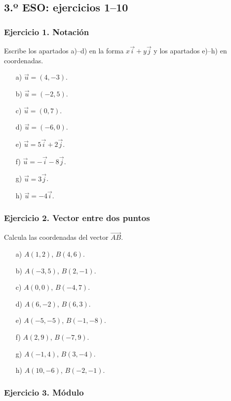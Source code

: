 \subsection{3.º ESO: ejercicios 1--10}

\subsubsection*{Ejercicio 1. Notación}

Escribe los apartados a)--d) en la forma $x\vec{i}+y\vec{j}$ y los apartados e)--h) en coordenadas.

\begin{enumerate}
    \item[a)] $\vec{u}=(4,-3)$.
    \item[b)] $\vec{u}=(-2,5)$.
    \item[c)] $\vec{u}=(0,7)$.
    \item[d)] $\vec{u}=(-6,0)$.
    \item[e)] $\vec{u}=5\vec{i}+2\vec{j}$.
    \item[f)] $\vec{u}=-\vec{i}-8\vec{j}$.
    \item[g)] $\vec{u}=3\vec{j}$.
    \item[h)] $\vec{u}=-4\vec{i}$.
\end{enumerate}

\subsubsection*{Ejercicio 2. Vector entre dos puntos}

Calcula las coordenadas del vector $\overrightarrow{AB}$.

\begin{enumerate}
    \item[a)] $A(1,2)$, $B(4,6)$.
    \item[b)] $A(-3,5)$, $B(2,-1)$.
    \item[c)] $A(0,0)$, $B(-4,7)$.
    \item[d)] $A(6,-2)$, $B(6,3)$.
    \item[e)] $A(-5,-5)$, $B(-1,-8)$.
    \item[f)] $A(2,9)$, $B(-7,9)$.
    \item[g)] $A(-1,4)$, $B(3,-4)$.
    \item[h)] $A(10,-6)$, $B(-2,-1)$.
\end{enumerate}

\subsubsection*{Ejercicio 3. Módulo}

